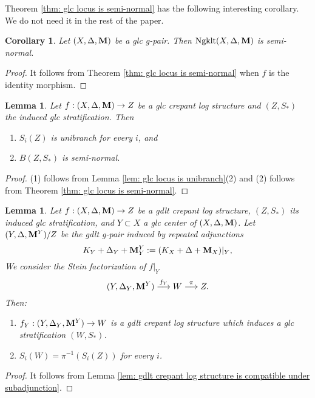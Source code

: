 \documentclass[11pt]{amsart}
\numberwithin{equation}{section}
\newcommand{\Mm}{{\bf{M}}}
\newcommand{\Ngklt}{\operatorname{Ngklt}}
\newtheorem{cor}[thm]{Corollary}
\newtheorem{lem}[thm]{Lemma}
\theoremstyle{definition}
\theoremstyle{definition}
\theoremstyle{definition}
\begin{document}
Theorem \ref{thm: glc locus is semi-normal} has the following
interesting corollary. We do not need it in the rest of the paper.

\begin{cor}
  Let $(X,\Delta,\Mm)$ be a glc g-pair. Then $\Ngklt(X,\Delta,\Mm)$
  is semi-normal.
\end{cor}
\begin{proof}
  It follows from Theorem \ref{thm: glc locus is semi-normal} when
  $f$ is the identity morphism.
\end{proof}

\begin{lem}\label{lem: (Z,S) is U and SN}
  Let $f:(X,\Delta,\Mm)\to Z$ be a glc crepant log structure and
  $(Z,S_*)$ the induced glc stratification. Then
  \begin{enumerate}
    \item  $S_i(Z)$ is unibranch for every $i$, and
    \item  $B(Z,S_*)$ is semi-normal.
  \end{enumerate}
\end{lem}

\begin{proof}
  (1) follows from Lemma \ref{lem: glc locus is unibranch}(2) and (2)
  follows from Theorem \ref{thm: glc locus is semi-normal}.
\end{proof}

\begin{lem}\label{lem: stratification is compatible under adjunction}
  Let $f: (X,\Delta,\Mm)\to Z$ be a gdlt crepant log structure,
  $(Z,S_*)$ its induced glc stratification, and $Y\subset X$ a glc
  center of $(X,\Delta,\Mm)$. Let $(Y,\Delta,\Mm^Y)/Z$ be the gdlt
  g-pair induced by repeated adjunctions
  $$K_Y+\Delta_Y+\Mm^Y_Y:=(K_X+\Delta+\Mm_X)|_Y,$$
  We consider the Stein factorization of $f|_Y$
  $$(Y,\Delta_Y,\Mm^Y)\stackrel{f_Y}{\longrightarrow}W\stackrel{\pi}{\longrightarrow}Z.$$
  Then:
  \begin{enumerate}
    \item $f_Y:(Y,\Delta_Y,\Mm^Y)\to W$ is a gdlt crepant log
      structure which induces a glc stratification $(W,S_*)$.
    \item $S_i(W)=\pi^{-1}(S_i(Z))$ for every $i$.
  \end{enumerate}
\end{lem}
\begin{proof}
  It follows from Lemma \ref{lem: gdlt crepant log structure is
  compatible under subadjunction}.
\end{proof}
\end{document}
